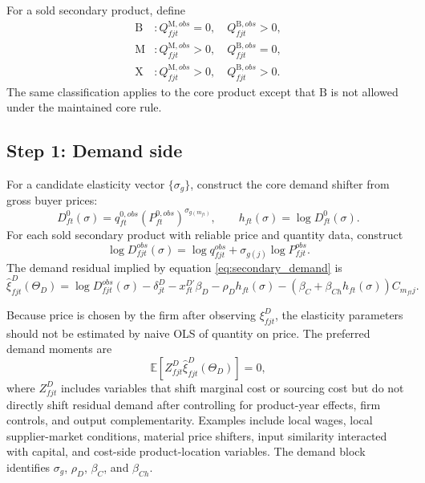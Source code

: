 \documentclass[11pt,a4paper]{article}
\newcommand{\E}{\mathbb{E}}
\newcommand{\M}{\mathrm{M}}
\newcommand{\B}{\mathrm{B}}
\newcommand{\X}{\mathrm{X}}
\begin{document}
For a sold secondary product, define
\begin{align*}
    \B &: Q^{\M,obs}_{fjt}=0,\quad Q^{\B,obs}_{fjt}>0,\\
    \M &: Q^{\M,obs}_{fjt}>0,\quad Q^{\B,obs}_{fjt}=0,\\
    \X &: Q^{\M,obs}_{fjt}>0,\quad Q^{\B,obs}_{fjt}>0.
\end{align*}
The same classification applies to the core product except that $\B$ is not allowed under the maintained core rule.

\subsection{Step 1: Demand side}

For a candidate elasticity vector $\{\sigma_g\}$, construct the core demand shifter from gross buyer prices:
\begin{equation}
    D^0_{ft}(\sigma)=q^{0,obs}_{ft}(P^{0,obs}_{ft})^{\sigma_{g(m_{ft})}},
    \qquad
    h_{ft}(\sigma)=\log D^0_{ft}(\sigma).
    \label{eq:D0_empirical}
\end{equation}
For each sold secondary product with reliable price and quantity data, construct
\begin{equation}
    \log D^{obs}_{fjt}(\sigma)
    =\log q^{obs}_{fjt}+\sigma_{g(j)}\log P^{obs}_{fjt}.
    \label{eq:D_obs}
\end{equation}
The demand residual implied by equation \eqref{eq:secondary_demand} is
\begin{equation}
    \widehat{\xi}^{D}_{fjt}(\Theta_D)
    =\log D^{obs}_{fjt}(\sigma)
    -\delta^D_{jt}
    -x^{D\prime}_{ft}\beta_D
    -\rho_D h_{ft}(\sigma)
    -\left(\beta_C+\beta_{Ch}h_{ft}(\sigma)\right)C_{m_{ft}j}.
    \label{eq:demand_residual}
\end{equation}

Because price is chosen by the firm after observing $\xi^D_{fjt}$, the elasticity parameters should not be estimated by naive OLS of quantity on price. The preferred demand moments are
\begin{equation}
    \E\left[Z^D_{fjt}\widehat{\xi}^{D}_{fjt}(\Theta_D)\right]=0,
    \label{eq:demand_moments}
\end{equation}
where $Z^D_{fjt}$ includes variables that shift marginal cost or sourcing cost but do not directly shift residual demand after controlling for product-year effects, firm controls, and output complementarity. Examples include local wages, local supplier-market conditions, material price shifters, input similarity interacted with capital, and cost-side product-location variables. The demand block identifies $\sigma_g$, $\rho_D$, $\beta_C$, and $\beta_{Ch}$.
\end{document}
